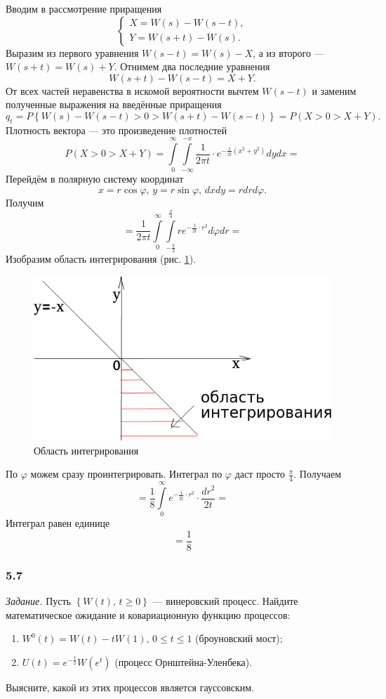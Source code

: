 Вводим в рассмотрение приращения
$$ \begin{cases}
    X = W \left( s \right) - W \left( s - t \right), \\
    Y = W \left( s + t \right) - W \left( s \right).
  \end{cases}$$
Выразим из первого уравнения $W \left( s - t \right) = W \left( s \right) - X$,
а из второго --- $W \left( s + t \right) = W \left( s \right) + Y$.
Отнимем два последние уравнения
$$W \left( s + t \right) - W \left( s - t \right) =
  X + Y.$$
От всех частей неравенства в искомой вероятности вычтем $W \left( s - t \right) $
и заменим полученные выражения на введённые приращения
$$q_t =
  P \left\{
    W \left( s \right) - W \left( s - t \right) > 0 >
    W \left( s + t \right) - W \left( s - t \right) \right\} =
  P \left( X > 0 > X + Y \right).$$
Плотность вектора --- это произведение плотностей
$$P \left( X > 0 > X + Y \right) =
  \int \limits_{0}^{ \infty } \int \limits_{- \infty }^{-x}
    \frac{1}{2 \pi t} \cdot e^{-\frac{1}{2t} \left( x^2 + y^2 \right) } dydx =$$
Перейдём в полярную систему координат
$$x = r \cos \varphi, \,
  y = r \sin \varphi, \,
  dxdy = rdrd \varphi.$$
Получим
$$= \frac{1}{2 \pi t} \int \limits_0^{ \infty }
  \int \limits_{-\frac{ \pi }{2}}^{ \frac{ \pi }{4}} re^{-\frac{1}{2t} \cdot r^2} d \varphi dr =$$
Изобразим область интегрирования (рис. \ref{fig:561}).

\begin{figure}[h!]
  \centering
  \includegraphics[width=.4\textwidth]{./pictures/5_6_1.png}
  \caption{Область интегрирования}
  \label{fig:561}
\end{figure}

По $ \varphi $ можем сразу проинтегрировать.
Интеграл по $ \varphi $ даст просто $ \frac{ \pi }{4}$.
Получаем
$$= \frac{1}{8} \int \limits_0^{ \infty } e^{-\frac{1}{2t} \cdot r^2} \cdot \frac{dr^2}{2t} =$$
Интеграл равен единице
$$= \frac{1}{8}$$

\subsubsection*{5.7}

\textit{Задание.}
Пусть $ \left\{ W \left( t \right), \, t \geq 0 \right\} $ --- винеровский процесс.
Найдите математическое ожидание и ковариационную функцию процессов:
\begin{enumerate}[label=\alph*)]
  \item $W^0 \left( t \right) = W \left( t \right) - tW \left( 1 \right), \, 0 \leq t \leq 1$
  (броуновский мост);
  \item $U \left( t \right) = e^{-\frac{t}{2}} W \left( e^t \right) $ (процесс Орнштейна-Уленбека).
\end{enumerate}
Выясните, какой из этих процессов является гауссовским.

